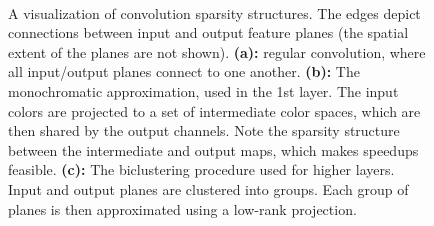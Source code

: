 \begin{figure}[ht]
\centering
\mbox{
\hspace{5mm}
\hspace{5mm}
}
\vspace{-3mm}
\caption{A visualization of convolution sparsity structures. The edges depict connections between input and
  output feature planes (the spatial extent of the planes are not
  shown). {\bf (a):} regular convolution, where all input/output planes
  connect to one another. {\bf (b):} The monochromatic
  approximation, used in the 1st layer. The input colors are projected
  to a set of intermediate color spaces, which are then shared by the
  output channels. Note the sparsity structure between the
  intermediate and output maps, which makes speedups feasible. {\bf
   (c):} The biclustering procedure used for higher layers. Input
 and output planes are clustered into groups. Each group of planes is
 then approximated using a low-rank projection.}
\end{figure}

